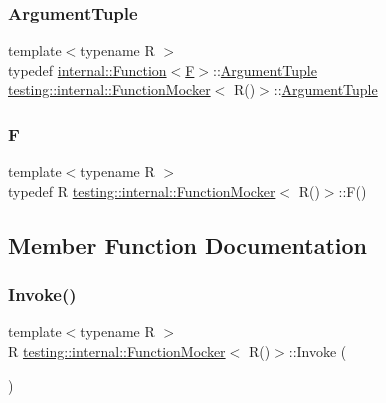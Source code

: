 \subsubsection{\texorpdfstring{Argument\+Tuple}{ArgumentTuple}}
{\footnotesize\ttfamily template$<$typename R $>$ \\
typedef \hyperlink{structtesting_1_1internal_1_1_function}{internal\+::\+Function}$<$\hyperlink{classtesting_1_1internal_1_1_function_mocker_3_01_r_07_08_4_a2c1d7da413176d87405227df90a95521}{F}$>$\+::\hyperlink{classtesting_1_1internal_1_1_function_mocker_3_01_r_07_08_4_a5a279e0d8414bf0809405c06a0725b66}{Argument\+Tuple} \hyperlink{classtesting_1_1internal_1_1_function_mocker}{testing\+::internal\+::\+Function\+Mocker}$<$ R()$>$\+::\hyperlink{classtesting_1_1internal_1_1_function_mocker_3_01_r_07_08_4_a5a279e0d8414bf0809405c06a0725b66}{Argument\+Tuple}}

\mbox{\label{classtesting_1_1internal_1_1_function_mocker_3_01_r_07_08_4_a2c1d7da413176d87405227df90a95521}} 
\subsubsection{\texorpdfstring{F}{F}}
{\footnotesize\ttfamily template$<$typename R $>$ \\
typedef R \hyperlink{classtesting_1_1internal_1_1_function_mocker}{testing\+::internal\+::\+Function\+Mocker}$<$ R()$>$\+::F()}



\subsection{Member Function Documentation}
\mbox{\label{classtesting_1_1internal_1_1_function_mocker_3_01_r_07_08_4_a8096a10aea2ffc6a78d0437855d2ef10}} 
\subsubsection{\texorpdfstring{Invoke()}{Invoke()}}
{\footnotesize\ttfamily template$<$typename R $>$ \\
R \hyperlink{classtesting_1_1internal_1_1_function_mocker}{testing\+::internal\+::\+Function\+Mocker}$<$ R()$>$\+::Invoke (\begin{DoxyParamCaption}{ }\end{DoxyParamCaption})\hspace{0.3cm}{\ttfamily [inline]}}

